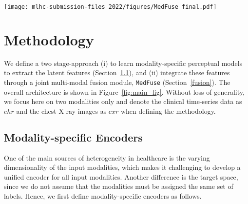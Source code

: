 \documentclass[pmlr]{jmlr}
\begin{document}
\begin{figure*}[t!]
    \centering
    \texttt{[image: mlhc-submission-files 2022/figures/MedFuse\_final.pdf]}
    \vspace{-5mm}
    \caption{\small\textbf{Overview of network with \texttt{MedFuse} module.} First, we pre-train the modality-specific encoders and classifiers independently for each input modality. Specifically, we train $f_{ehr}$ and $g_{ehr}$ using the clinical time-series data and $f_{cxr}$ and $g_{cxr}$ using the chest X-ray images. Next, we project the chest X-ray latent representation $\mathbf{v}_{cxr}$ to $\mathbf{v}^*_{cxr}$, in order to match the dimension of $\mathbf{v}_{ehr}$. We pass $\mathbf{v}_{ehr}$ and $\mathbf{v}^*_{cxr}$ as an input sequence to the LSTM-based $f_{fusion}$, and we classify its last hidden state $\mathbf{h}_{fusion}$ to compute the overall prediction $\mathbf{\hat{y}}_{fusion}$. $f_{fusion}$, $f_{ehr}$, $f_{cxr}$, $g_{fusion}$, and $\phi$ are fine-tuned together for fusion.\vspace{-5mm} }
    \label{fig:main_fig}
    \vspace{-4mm}
\end{figure*}

\vspace{-0.5mm}
\section{Methodology}
\label{sec:method}


We define a two stage-approach (i) to learn modality-specific perceptual models to extract the latent features (Section~\ref{encoders}), and (ii) integrate these features through a joint multi-modal fusion module, \texttt{MedFuse} (Section~\ref{fusion}). The overall architecture is shown in Figure~\ref{fig:main_fig}. Without loss of generality, we focus here on two modalities only and denote the clinical time-series data as $ehr$ and the chest X-ray images as $cxr$ when defining the methodology.


\subsection{Modality-specific Encoders} \label{encoders}
One of the main sources of heterogeneity in healthcare is the varying dimensionality of the input modalities, which makes it challenging to develop a unified encoder for all input modalities. Another difference is the target space, since we do not assume that the modalities must be assigned the same set of labels. Hence, we first define modality-specific encoders as follows. 
\end{document}
